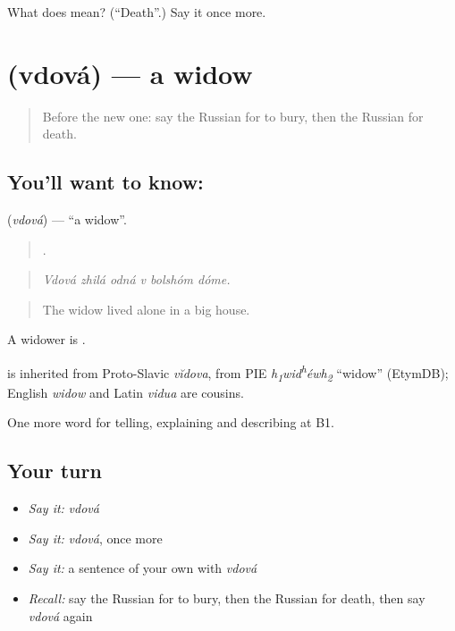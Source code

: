 \begin{tcolorbox}[breakable,colback=teal!4,colframe=teal!35!black,title={Before you move on}]
What does  mean? (\textquotedblleft{}Death\textquotedblright{}.) Say it once more.
\end{tcolorbox}
\section[\texorpdfstring{\ru{вдова} (vdová)}{вдова (vdová)}]{ (vdová) — a widow}

\label{lesson:RU-C309-vdova}



\begin{quote}
Before the new one: say the Russian for to bury, then the Russian for death.
\end{quote}

\subsection*{You'll want to know: }
\textbf{} (\emph{vdová}) — \textquotedblleft{}a widow\textquotedblright{}.

\begin{quote}
     .
\end{quote}

\begin{quote}
\emph{Vdová zhilá odná v bolshóm dóme.}
\end{quote}

\begin{quote}
The widow lived alone in a big house.
\end{quote}

A widower is \emph{}.

\begin{cousinweb}
\emph{} is inherited from Proto-Slavic \emph{vĭdova}, from PIE \emph{h\textsubscript{1}wid\textsuperscript{h}éwh\textsubscript{2}} \textquotedblleft{}widow\textquotedblright{} (EtymDB); English \emph{widow} and Latin \emph{vidua} are cousins.
\end{cousinweb}

\begin{grammarlens}[title={What you've built}]
One more word for telling, explaining and describing at B1.
\end{grammarlens}

\subsection*{Your turn}
\begin{itemize}
\raggedright
  \item \emph{Say it:} \emph{vdová}
  \item \emph{Say it:} \emph{vdová}, once more
  \item \emph{Say it:} a sentence of your own with \emph{vdová}
  \item \emph{Recall:} say the Russian for to bury, then the Russian for death, then say \emph{vdová} again
\end{itemize}


